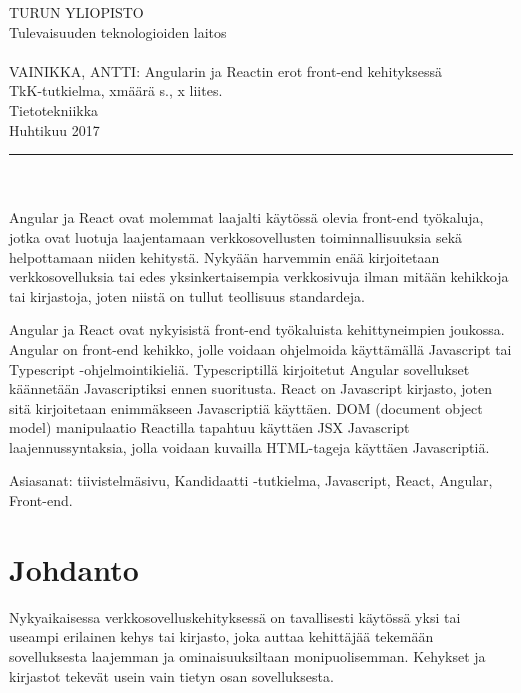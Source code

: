 \documentclass[a4paper,12pt,twoside]{article} %
\begin{document}
\begin{minipage}{15cm}

\noindent
TURUN YLIOPISTO\\
Tulevaisuuden teknologioiden laitos\\
\\
VAINIKKA, ANTTI: Angularin ja Reactin erot front-end kehityksessä\\
TkK-tutkielma, xmäärä s., x liites.\\
Tietotekniikka\\
Huhtikuu 2017\\
\rule{\textwidth}{.2mm}\\
\\
Angular ja React ovat molemmat laajalti käytössä olevia front-end työkaluja, jotka ovat luotuja laajentamaan verkkosovellusten toiminnallisuuksia sekä helpottamaan niiden kehitystä. Nykyään harvemmin enää kirjoitetaan verkkosovelluksia tai edes yksinkertaisempia verkkosivuja ilman mitään kehikkoja tai kirjastoja, joten niistä on tullut teollisuus standardeja.

\vspace{4mm}\noindent Angular ja React ovat nykyisistä front-end työkaluista kehittyneimpien joukossa. Angular on front-end kehikko, jolle voidaan ohjelmoida käyttämällä Javascript tai Typescript -ohjelmointikieliä. Typescriptillä kirjoitetut Angular sovellukset käännetään Javascriptiksi ennen suoritusta. React on Javascript kirjasto, joten sitä kirjoitetaan enimmäkseen Javascriptiä käyttäen. DOM (document object model) manipulaatio Reactilla tapahtuu käyttäen JSX Javascript laajennussyntaksia, jolla voidaan kuvailla HTML-tageja käyttäen Javascriptiä.

\vspace{4mm}\noindent Asiasanat: tiivistelmäsivu, Kandidaatti -tutkielma, Javascript, React, Angular, Front-end.

\end{minipage}
\newpage
\tableofcontents
\newpage
\pagestyle{plain} 
\setcounter{page}{1}

\addtolength{\oddsidemargin}{1.1cm}
\addtolength{\voffset}{2.3cm}



\section{Johdanto}
Nykyaikaisessa verkkosovelluskehityksessä on tavallisesti käytössä yksi tai useampi erilainen kehys tai kirjasto, joka auttaa kehittäjää tekemään sovelluksesta laajemman ja ominaisuuksiltaan monipuolisemman. Kehykset ja kirjastot tekevät usein vain tietyn osan sovelluksesta.
\end{document}
